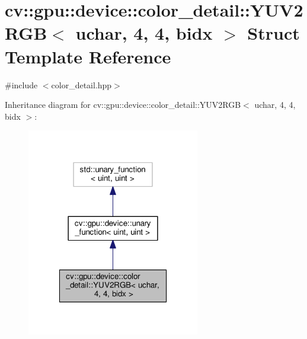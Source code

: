 \hypertarget{structcv_1_1gpu_1_1device_1_1color__detail_1_1YUV2RGB_3_01uchar_00_014_00_014_00_01bidx_01_4}{\section{cv\-:\-:gpu\-:\-:device\-:\-:color\-\_\-detail\-:\-:Y\-U\-V2\-R\-G\-B$<$ uchar, 4, 4, bidx $>$ Struct Template Reference}
\label{structcv_1_1gpu_1_1device_1_1color__detail_1_1YUV2RGB_3_01uchar_00_014_00_014_00_01bidx_01_4}
}


{\ttfamily \#include $<$color\-\_\-detail.\-hpp$>$}



Inheritance diagram for cv\-:\-:gpu\-:\-:device\-:\-:color\-\_\-detail\-:\-:Y\-U\-V2\-R\-G\-B$<$ uchar, 4, 4, bidx $>$\-:\nopagebreak
\begin{figure}[H]
\begin{center}
\leavevmode
\includegraphics[width=214pt]{structcv_1_1gpu_1_1device_1_1color__detail_1_1YUV2RGB_3_01uchar_00_014_00_014_00_01bidx_01_4__inherit__graph}
\end{center}
\end{figure}


